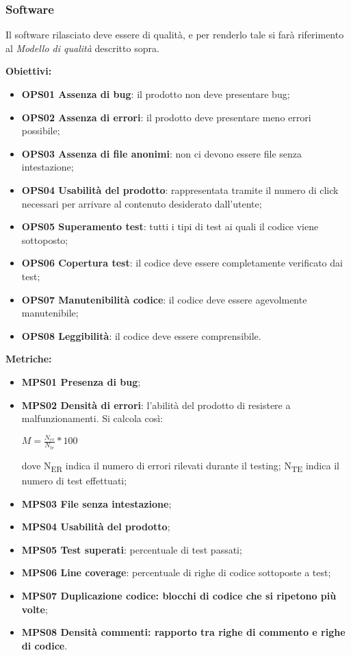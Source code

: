 \documentclass[../piano_di_qualifica.tex]{subfiles}
\begin{document}
\subsubsection{Software}
Il software rilasciato deve essere di qualità, e per renderlo tale si farà riferimento al \emph{Modello di qualità} descritto sopra.

\textbf{Obiettivi:}
\smallbreak
\begin{itemize}
	\item \textbf{OPS01 Assenza di bug}: il prodotto non deve presentare bug;
	\item \textbf{OPS02 Assenza di errori}: il prodotto deve presentare meno errori possibile;
	\item \textbf{OPS03 Assenza di file anonimi}: non ci devono essere file senza intestazione;
	\item \textbf{OPS04 Usabilità del prodotto}: rappresentata tramite il numero di click necessari per arrivare al contenuto desiderato dall'utente;
	\item \textbf{OPS05 Superamento test}: tutti i tipi di test ai quali il codice viene sottoposto;
	\item \textbf{OPS06 Copertura test}: il codice deve essere completamente verificato dai test;
	\item \textbf{OPS07 Manutenibilità codice}: il codice deve essere agevolmente manutenibile;
	\item \textbf{OPS08 Leggibilità}: il codice deve essere comprensibile.
\end{itemize}

\textbf{Metriche:}
\smallbreak
\begin{itemize}
	\item \textbf{MPS01 Presenza di bug};
	\item \textbf{MPS02 Densità di errori}: l'abilità del prodotto di resistere a malfunzionamenti. Si calcola così:
	      \begin{center} $M = \frac{N_{er}}{N_{te}} * 100$ \end{center}
	      dove
	      \subitem N\textsubscript{ER} indica il numero di errori rilevati durante il testing;
	      \subitem N\textsubscript{TE} indica il numero di test effettuati;
	\item \textbf{MPS03 File senza intestazione};
	\item \textbf{MPS04 Usabilità del prodotto};
	\item \textbf{MPS05 Test superati}: percentuale di test passati;
	\item \textbf{MPS06 Line coverage}: percentuale di righe di codice sottoposte a test;
	\item \textbf{MPS07 Duplicazione codice: blocchi di codice che si ripetono più volte};
	\item \textbf{MPS08 Densità commenti: rapporto tra righe di commento e righe di codice}.
\end{itemize}
\end{document}
